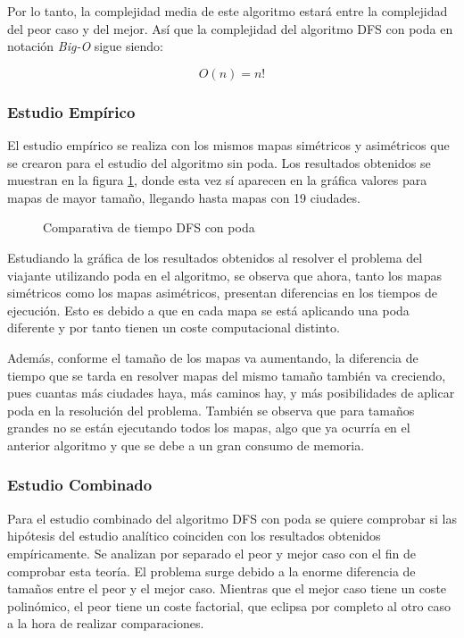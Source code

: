 \documentclass{uc3mpracticas}
\begin{document}
  Por lo tanto, la complejidad media de este algoritmo estará entre la complejidad del peor caso y del mejor. Así que la complejidad del algoritmo DFS con poda en notación \textit{Big-O} sigue siendo:

  $$ O(n) = n! $$


  \subsubsection{Estudio Empírico}

  El estudio empírico se realiza con los mismos mapas simétricos y asimétricos que se crearon para el estudio del algoritmo sin poda. Los resultados obtenidos se muestran en la figura \ref{fig:compDFSpoda}, donde esta vez sí aparecen en la gráfica valores para mapas de mayor tamaño, llegando hasta mapas con 19 ciudades.

  \begin{figure}[!h]
    \caption{Comparativa de tiempo DFS con poda}
    \label{fig:compDFSpoda}
  \end{figure}

  Estudiando la gráfica de los resultados obtenidos al resolver el problema del viajante utilizando poda en el algoritmo, se observa que ahora, tanto los mapas simétricos como los mapas asimétricos, presentan diferencias en los tiempos de ejecución. Esto es debido a que en cada mapa se está aplicando una poda diferente y por tanto tienen un coste computacional distinto.

  \vspace{2mm}

  Además, conforme el tamaño de los mapas va aumentando, la diferencia de tiempo que se tarda en resolver mapas del mismo tamaño también va creciendo, pues cuantas más ciudades haya, más caminos hay, y más posibilidades de aplicar poda en la resolución del problema. También se observa que para tamaños grandes no se están ejecutando todos los mapas, algo que ya ocurría en el anterior algoritmo y que se debe a un gran consumo de memoria.




  \subsubsection{Estudio Combinado}

  Para el estudio combinado del algoritmo DFS con poda se quiere comprobar si las hipótesis del estudio analítico coinciden con los resultados obtenidos empíricamente. Se analizan por separado el peor y mejor caso con el fin de comprobar esta teoría. El problema surge debido a la enorme diferencia de tamaños entre el peor y el mejor caso. Mientras que el mejor caso tiene un coste polinómico, el peor tiene un coste factorial, que eclipsa por completo al otro caso a la hora de realizar comparaciones.
\end{document}
